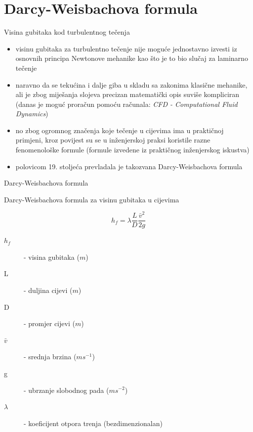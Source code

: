 \documentclass[croatian]{beamer}
\begin{document}
\section{Darcy-Weisbachova formula}
\begin{frame}{Visina gubitaka kod turbulentnog tečenja}
\begin{itemize}
\item visinu gubitaka za turbulentno tečenje nije moguće jednostavno izvesti
iz osnovnih principa Newtonove mehanike kao što je to bio slučaj za
laminarno tečenje
\item naravno da se tekućina i dalje giba u skladu sa zakonima klasične
mehanike, ali je zbog miješanja slojeva precizan matematički opis
suviše kompliciran (danas je moguć proračun pomoću računala: \emph{CFD
- Computational Fluid Dynamics})
\item no zbog ogromnog značenja koje tečenje u cijevima ima u praktičnoj
primjeni, kroz povijest su se u inženjerskoj praksi koristile razne
fenomenološke formule (formule izvedene iz praktičnog inženjerskog
iskustva)
\item polovicom 19. stoljeća prevladala je takozvana \alert{Darcy-Weisbachova formula}
\end{itemize}
\end{frame}

\begin{frame}{Darcy-Weisbachova formula}

\begin{block}{Darcy-Weisbachova formula za visinu gubitaka u cijevima}

\[
h_{f}=\lambda\frac{L}{D}\frac{\bar{v}^{2}}{2g}
\]
\end{block}
\begin{description}
\item [{$h_{f}$}] - visina gubitaka ($m$)
\item [{L}] - duljina cijevi ($m$)
\item [{D}] - promjer cijevi ($m$)
\item [{$\bar{v}$}] - srednja brzina ($ms^{-1}$)
\item [{g}] - ubrzanje slobodnog pada ($ms^{-2}$)
\item [{$\lambda$}] - \alert{koeficijent otpora trenja} (bezdimenzionalan)
\end{description}
\end{frame}
\end{document}
